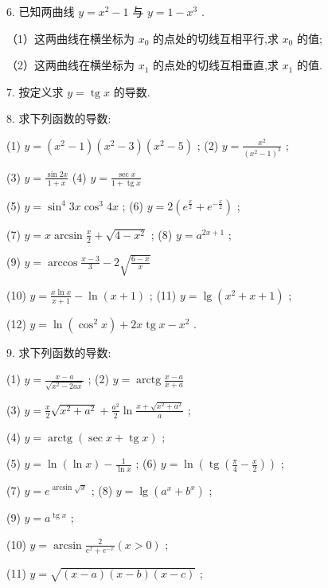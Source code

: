 \documentclass[lang=cn,newtx,12pt,scheme=chinese]{elegantbook}
\begin{document}
6. 已知两曲线 \(y = {x}^{2} - 1\) 与 \(y = 1 - {x}^{3}\) .

（1）这两曲线在横坐标为 \({x}_{0}\) 的点处的切线互相平行,求 \({x}_{0}\) 的值;

（2）这两曲线在横坐标为 \({x}_{1}\) 的点处的切线互相垂直,求 \({x}_{1}\) 的值.

7. 按定义求 \(y = \operatorname{tg}x\) 的导数.

8. 求下列函数的导数:

(1) \(y = \left( {{x}^{2} - 1}\right) \left( {{x}^{2} - 3}\right) \left( {{x}^{2} - 5}\right)\) ; (2) \(y = \frac{{x}^{2}}{{\left( {x}^{2} - 1\right) }^{3}}\) ;

(3) \(y = \frac{\sin {2x}}{1 + x}\) (4) \(y = \frac{\sec x}{1 + \operatorname{tg}x}\)

(5) \(y = {\sin }^{4}{3x}{\cos }^{3}{4x}\) ; (6) \(y = 2\left( {{e}^{\frac{x}{2}} + {e}^{-\frac{x}{2}}}\right)\) ;

(7) \(y = x\arcsin \frac{x}{2} + \sqrt{4 - {x}^{2}}\) ; (8) \(y = {a}^{{2x} + 1}\) ;

(9) \(y = \arccos \frac{x - 3}{3} - 2\sqrt{\frac{6 - x}{x}}\)

(10) \(y = \frac{x\ln x}{x + 1} - \ln \left( {x + 1}\right)\) ; (11) \(y = \lg \left( {{x}^{2} + x + 1}\right)\) ;

(12) \(y = \ln \left( {{\cos }^{2}x}\right) + {2x}\operatorname{tg}x - {x}^{2}\) .

9. 求下列函数的导数:

(1) \(y = \frac{x - a}{\sqrt{{x}^{2} - {2ax}}}\) ; (2) \(y = \operatorname{arctg}\frac{x - a}{x + a}\)

(3) \(y = \frac{x}{2}\sqrt{{x}^{2} + {a}^{2}} + \frac{{a}^{2}}{2}\ln \frac{x + \sqrt{{x}^{2} + {a}^{2}}}{a}\) ;

(4) \(y = \operatorname{arctg}\left( {\sec x + \operatorname{tg}x}\right)\) ;

(5) \(y = \ln \left( {\ln x}\right) - \frac{1}{\ln x}\) ; (6) \(y = \ln \left( {\operatorname{tg}\left( {\frac{\pi }{4} - \frac{x}{2}}\right) }\right)\) ;

(7) \(y = {e}^{\arcsin \sqrt{x}}\) ; (8) \(y = \lg \left( {{a}^{x} + {b}^{x}}\right)\) ;

(9) \(y = {a}^{\operatorname{tg}x}\) ;

(10) \(y = \arcsin \frac{2}{{e}^{x} + {e}^{-x}}\left( {x > 0}\right)\) ;

(11) \(y = \sqrt{\left( {x - a}\right) \left( {x - b}\right) \left( {x - c}\right) }\) ;
\end{document}
